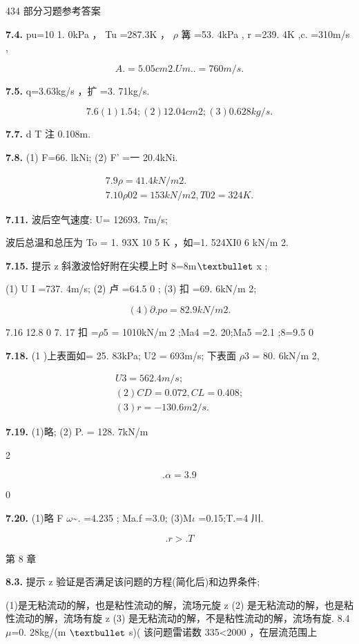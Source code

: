 434 部分习题参考答案

\noindent\textbf{7.4.} pu=10 1. 0kPa ， Tu =287.3K ， $\rho$ 篝 =53. 4kPa , r =239. 4K ,c. =310m/s ,

\[A. =5. 05cm 2 .Um..=760m/s.\]

\noindent\textbf{7.5.} q=3.63kg/s ，扩 =3. 71kg/s.

\[7.6 (1) 1. 54; (2) 12.04cm 2; (3) 0.628kg/s.\]

\noindent\textbf{7.7.} d T 注 0.108m.

\noindent\textbf{7.8.} (1) F=66. lkNi; (2) F' =一 20.4kNi.

\begin{gather*}
7.9\rho =4 1. 4kN/m 2.\\
7.10\rho 02 = 153kN/m 2, T02 =324 K.
\end{gather*}

\noindent\textbf{7.11.} 波后空气速度: U= 12693. 7m/s;

波后总温和总压为 To = 1. 93X 10 5 K ，如=1. 524XI0 6 kN/m 2.

\noindent\textbf{7.15.} 提示 z 斜激波恰好附在尖模上时 8=8m${\rm •}$ x ;

(1) U I =737. 4m/s; (2) 卢 =64.5 0 ; (3) 扣 =69. 6kN/m 2;

\[(4) \partial .po =82. 9kN/m 2.\]

7.16 12.8 0 7. 17 扣 =$\rho$5 = 1010kN/m 2 ;Ma4 =2. 20;Ma5 =2.1 ;8=9.5 0

\noindent\textbf{7.18.} (1 )上表面如= 25. 83kPa; U2 = 693m/s; 下表面 $\rho$3 = 80. 6kN/m 2,

\begin{gather*}
U3 =562.4m/s;\\
(2) CD =0.072 ,CL =0.408;\\
(3) r=-130.6m 2/s.
\end{gather*}

\noindent\textbf{7.19.} (1)略; (2) P. = 128. 7kN/m

2

\[.\alpha =3.9\]

0

\noindent\textbf{7.20.} (1)略 F $\omega$\textasciitilde{}. =4.235 ; Ma.f =3.0; (3)M$\iota$ =0.15;T.=4 川.

\[.r>. T\]

第 8 章

\noindent\textbf{8.3.} 提示 z 验证是否满足该问题的方程(简化后)和边界条件;

(1)是无粘流动的解，也是粘性流动的解，流场元旋 z (2) 是无粘流动的解，也是粘性流动的解，流场有旋 z (3) 是无粘流动的解，不是粘性流动的解，流场有旋. 8.4$\mu$=0. 28kg/(m ${\rm •}$ s)( 该问题雷诺数 335<2000 ，在层流范围上

